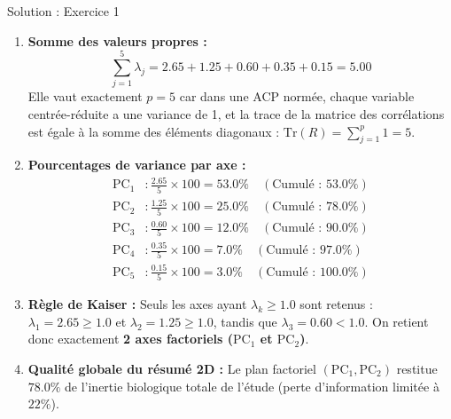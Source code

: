 \documentclass[11pt,a4paper]{article}
\begin{document}
\begin{solutionbox}{Solution : Exercice 1}
\begin{enumerate}[label=\textbf{\alph*.}]
  \item \textbf{Somme des valeurs propres :}
  \begin{equation*}
    \sum_{j=1}^5 \lambda_j = 2.65 + 1.25 + 0.60 + 0.35 + 0.15 = \mathbf{5.00}
  \end{equation*}
  Elle vaut exactement $p = 5$ car dans une ACP normée, chaque variable centrée-réduite a une variance de 1, et la trace de la matrice des corrélations est égale à la somme des éléments diagonaux : $\text{Tr}(R) = \sum_{j=1}^p 1 = 5$.
  \item \textbf{Pourcentages de variance par axe :}
  \begin{align*}
    \text{PC}_1 &: \frac{2.65}{5} \times 100 = \mathbf{53.0\%} \quad (\text{Cumulé : } 53.0\%) \\
    \text{PC}_2 &: \frac{1.25}{5} \times 100 = \mathbf{25.0\%} \quad (\text{Cumulé : } 78.0\%) \\
    \text{PC}_3 &: \frac{0.60}{5} \times 100 = \mathbf{12.0\%} \quad (\text{Cumulé : } 90.0\%) \\
    \text{PC}_4 &: \frac{0.35}{5} \times 100 = \mathbf{7.0\%} \quad (\text{Cumulé : } 97.0\%) \\
    \text{PC}_5 &: \frac{0.15}{5} \times 100 = \mathbf{3.0\%} \quad (\text{Cumulé : } 100.0\%)
  \end{align*}
  \item \textbf{Règle de Kaiser :}
  Seuls les axes ayant $\lambda_k \ge 1.0$ sont retenus :
  $\lambda_1 = 2.65 \ge 1.0$ et $\lambda_2 = 1.25 \ge 1.0$, tandis que $\lambda_3 = 0.60 < 1.0$.
  On retient donc exactement \textbf{2 axes factoriels ($\text{PC}_1$ et $\text{PC}_2$)}.
  \item \textbf{Qualité globale du résumé 2D :}
  Le plan factoriel $(\text{PC}_1, \text{PC}_2)$ restitue $\mathbf{78.0\%}$ de l'inertie biologique totale de l'étude (perte d'information limitée à $22\%$).
\end{enumerate}
\end{solutionbox}
\end{document}
